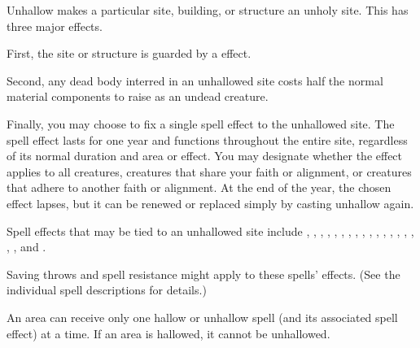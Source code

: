 \spellrng{\rngclose}
\begin{spelleffect}
Unhallow makes a particular site, building, or structure an unholy site. This has three major effects.
\par First, the site or structure is guarded by a  effect.
\par Second, any dead body interred in an unhallowed site costs half the normal material components to raise as an undead creature.
\par Finally, you may choose to fix a single spell effect to the unhallowed site. The spell effect lasts for one year and functions throughout the entire site, regardless of its normal duration and area or effect. You may designate whether the effect applies to all creatures, creatures that share your faith or alignment, or creatures that adhere to another faith or alignment. At the end of the year, the chosen effect lapses, but it can be renewed or replaced simply by casting unhallow again.
\par Spell effects that may be tied to an unhallowed site include , , , , , , , , , , , , , , , , , , and .
\par Saving throws and spell resistance might apply to these spells' effects. (See the individual spell descriptions for details.)
\end{spelleffect}
\begin{spellnotes}
An area can receive only one hallow or unhallow spell (and its associated spell effect) at a time. If an area is hallowed, it cannot be unhallowed.
\end{spellnotes}

